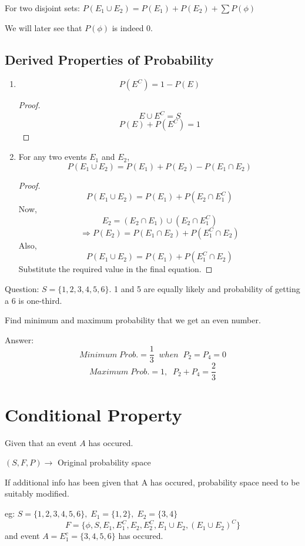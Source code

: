 \documentclass{article}
\begin{document}
For two disjoint sets:
$P(E_1 \cup E_2)= P(E_1)+P(E_2)+ \sum P(\phi)$

We will later see that $P(\phi)$ is indeed 0.

\subsection{Derived Properties of Probability}
\begin{enumerate}
    \item $$P(E^C)=1-P(E)$$
        \begin{proof}
            $$E \cup E^C = S$$
                $$P(E)+P(E^C)=1$$

        \end{proof}
    \item For any two events $E_1$ and $E_2$,
    $$ P(E_1 \cup E_2)= P(E_1)+P(E_2)-P(E_1 \cap E_2)$$
    \begin{proof}
        $$ P(E_1 \cup E_2)=P(E_1)+P(E_2 \cap E_1^C)$$
        Now, $$ E_2=(E_2 \cap E_1)\cup (E_2 \cap E_1^C)$$
        $$ \Rightarrow P(E_2)=P(E_1 \cap E_2)+ P(E_1^C \cap E_2)$$
        Also,
        $$ P(E_1 \cup E_2)= P(E_1)+P(E_1^C \cap E_2)$$
        Substitute the required value in the final equation.
    \end{proof}
\end{enumerate}

Question:
$ S=\{1,2,3,4,5,6\}$. 1 and 5 are equally likely and probability of getting a 6 is one-third.

Find minimum and maximum probability that we get an even number.

Answer:$$ Minimum \;Prob. = \frac{1}{3} \;\; when \;\; P_2 = P_4 = 0$$
$$ Maximum \;Prob. = 1,  \;\; P_2+P_4 =\frac{2}{3}  $$


\section{Conditional Property}

Given that an event $A$ has occured.

$ (S,F,P) \rightarrow$ Original probability space

If additional info has been given that A has occured, probability space need to be suitably modified.

eg: $S=\{1,2,3,4,5,6\},\;E_1=\{1,2\},\;E_2=\{3,4\}$
$$ F=\{\phi , S, E_1 , E_{1}^{C},E_2 , E_{2}^{C},E_1 \cup E_2 , (E_{1} \cup E_{2})^{C}\}$$
and event $A=E_1^c = \{3,4,5,6\}$ has occured.
\end{document}
